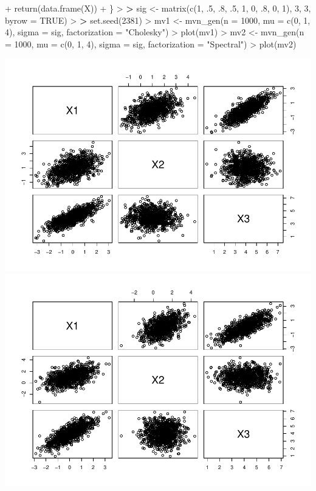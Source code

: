 \documentclass[
]{article}
\newenvironment{Shaded}{\begin{snugshade}}{\end{snugshade}}
\newcommand{\AttributeTok}[1]{\textcolor[rgb]{0.77,0.63,0.00}{#1}}
\newcommand{\ConstantTok}[1]{\textcolor[rgb]{0.00,0.00,0.00}{#1}}
\newcommand{\DecValTok}[1]{\textcolor[rgb]{0.00,0.00,0.81}{#1}}
\newcommand{\ErrorTok}[1]{\textcolor[rgb]{0.64,0.00,0.00}{\textbf{#1}}}
\newcommand{\FunctionTok}[1]{\textcolor[rgb]{0.00,0.00,0.00}{#1}}
\newcommand{\NormalTok}[1]{#1}
\newcommand{\OtherTok}[1]{\textcolor[rgb]{0.56,0.35,0.01}{#1}}
\newcommand{\SpecialCharTok}[1]{\textcolor[rgb]{0.00,0.00,0.00}{#1}}
\newcommand{\StringTok}[1]{\textcolor[rgb]{0.31,0.60,0.02}{#1}}
\begin{document}
\begin{Shaded}
\begin{Highlighting}[]
\SpecialCharTok{+}   \FunctionTok{return}\NormalTok{(}\FunctionTok{data.frame}\NormalTok{(X))}
\SpecialCharTok{+}\NormalTok{ \}}
\SpecialCharTok{\textgreater{}} 
\ErrorTok{\textgreater{}}\NormalTok{ sig }\OtherTok{\textless{}{-}} \FunctionTok{matrix}\NormalTok{(}\FunctionTok{c}\NormalTok{(}\DecValTok{1}\NormalTok{, .}\DecValTok{5}\NormalTok{, .}\DecValTok{8}\NormalTok{, .}\DecValTok{5}\NormalTok{, }\DecValTok{1}\NormalTok{, }\DecValTok{0}\NormalTok{, .}\DecValTok{8}\NormalTok{, }\DecValTok{0}\NormalTok{, }\DecValTok{1}\NormalTok{), }\DecValTok{3}\NormalTok{, }\DecValTok{3}\NormalTok{, }\AttributeTok{byrow =} \ConstantTok{TRUE}\NormalTok{)}
\SpecialCharTok{\textgreater{}} 
\ErrorTok{\textgreater{}} \FunctionTok{set.seed}\NormalTok{(}\DecValTok{2381}\NormalTok{)}
\SpecialCharTok{\textgreater{}}\NormalTok{ mv1 }\OtherTok{\textless{}{-}} \FunctionTok{mvn\_gen}\NormalTok{(}\AttributeTok{n =} \DecValTok{1000}\NormalTok{, }\AttributeTok{mu =} \FunctionTok{c}\NormalTok{(}\DecValTok{0}\NormalTok{, }\DecValTok{1}\NormalTok{, }\DecValTok{4}\NormalTok{), }\AttributeTok{sigma =}\NormalTok{ sig, }\AttributeTok{factorization =} \StringTok{"Cholesky"}\NormalTok{)}
\SpecialCharTok{\textgreater{}} \FunctionTok{plot}\NormalTok{(mv1)}
\SpecialCharTok{\textgreater{}}\NormalTok{ mv2 }\OtherTok{\textless{}{-}} \FunctionTok{mvn\_gen}\NormalTok{(}\AttributeTok{n =} \DecValTok{1000}\NormalTok{, }\AttributeTok{mu =} \FunctionTok{c}\NormalTok{(}\DecValTok{0}\NormalTok{, }\DecValTok{1}\NormalTok{, }\DecValTok{4}\NormalTok{), }\AttributeTok{sigma =}\NormalTok{ sig, }\AttributeTok{factorization =} \StringTok{"Spectral"}\NormalTok{)}
\SpecialCharTok{\textgreater{}} \FunctionTok{plot}\NormalTok{(mv2)}
\end{Highlighting}
\end{Shaded}

\includegraphics[width=0.5\linewidth,height=0.5\textheight]{R_Tricks_For_ComputationStats_files/figure-latex/unnamed-chunk-7-1}
\includegraphics[width=0.5\linewidth,height=0.5\textheight]{R_Tricks_For_ComputationStats_files/figure-latex/unnamed-chunk-7-2}
\end{document}
